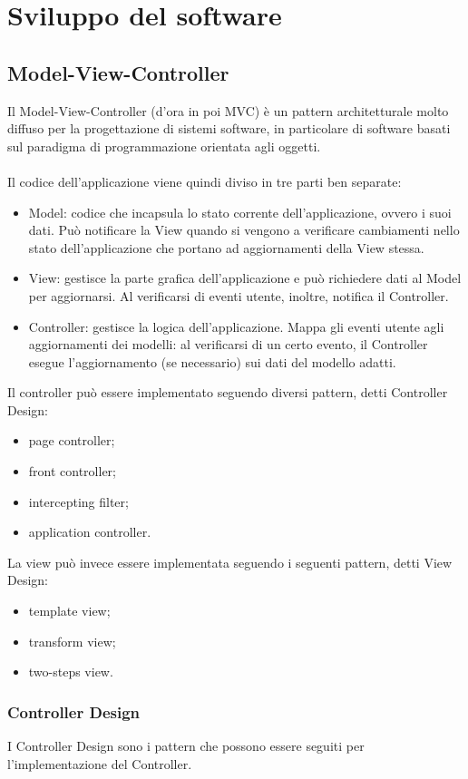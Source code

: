 \chapter{Sviluppo del software}
\section{Model-View-Controller}
Il Model-View-Controller (d'ora in poi MVC) è un pattern architetturale molto diffuso per la progettazione di sistemi software, in particolare di software basati sul paradigma di programmazione orientata agli oggetti.\\
\\
Il codice dell'applicazione viene quindi diviso in tre parti ben separate:
\begin{itemize}
    \item Model: codice che incapsula lo stato corrente dell'applicazione, ovvero i suoi dati.
    Può notificare la View quando si vengono a verificare cambiamenti nello stato dell'applicazione che portano ad aggiornamenti della View stessa.
    \item View: gestisce la parte grafica dell'applicazione e può richiedere dati al Model per aggiornarsi. Al verificarsi di eventi utente, inoltre, notifica il Controller.
    \item Controller: gestisce la logica dell'applicazione. Mappa gli eventi utente agli aggiornamenti dei modelli: al verificarsi di un certo evento, il Controller esegue l'aggiornamento (se necessario) sui dati del modello adatti.
\end{itemize}
Il controller può essere implementato seguendo diversi pattern, detti Controller Design:
\begin{itemize}
    \item page controller;
    \item front controller;
    \item intercepting filter;
    \item application controller.
\end{itemize}
La view può invece essere implementata seguendo i seguenti pattern, detti View Design:
\begin{itemize}
    \item template view;
    \item transform view;
    \item two-steps view.
\end{itemize}

\subsection{Controller Design}
I Controller Design sono i pattern che possono essere seguiti per l'implementazione del Controller.
